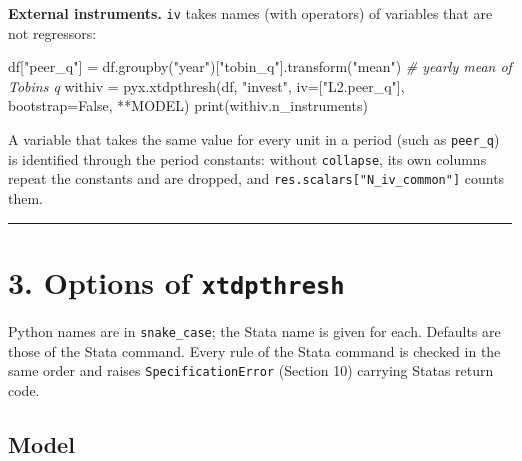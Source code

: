 \documentclass[
  10.5pt,
  a4paper,
]{article}
\newenvironment{Shaded}{}{}
\newcommand{\BuiltInTok}[1]{\textcolor[rgb]{0.00,0.50,0.00}{#1}}
\newcommand{\CommentTok}[1]{\textcolor[rgb]{0.38,0.63,0.69}{\textit{#1}}}
\newcommand{\NormalTok}[1]{#1}
\newcommand{\OperatorTok}[1]{\textcolor[rgb]{0.40,0.40,0.40}{#1}}
\newcommand{\StringTok}[1]{\textcolor[rgb]{0.25,0.44,0.63}{#1}}
\newcommand{\VariableTok}[1]{\textcolor[rgb]{0.10,0.09,0.49}{#1}}
\begin{document}
\textbf{External instruments.} \texttt{iv} takes names (with operators)
of variables that are not regressors:

\begin{Shaded}
\begin{Highlighting}[]
\NormalTok{df[}\StringTok{"peer\_q"}\NormalTok{] }\OperatorTok{=}\NormalTok{ df.groupby(}\StringTok{"year"}\NormalTok{)[}\StringTok{"tobin\_q"}\NormalTok{].transform(}\StringTok{"mean"}\NormalTok{)  }\CommentTok{\# yearly mean of Tobin\textquotesingle{}s q}
\NormalTok{withiv }\OperatorTok{=}\NormalTok{ pyx.xtdpthresh(df, }\StringTok{"invest"}\NormalTok{, iv}\OperatorTok{=}\NormalTok{[}\StringTok{"L2.peer\_q"}\NormalTok{], bootstrap}\OperatorTok{=}\VariableTok{False}\NormalTok{, }\OperatorTok{**}\NormalTok{MODEL)}
\BuiltInTok{print}\NormalTok{(withiv.n\_instruments)}
\end{Highlighting}
\end{Shaded}

A variable that takes the same value for every unit in a period (such as
\texttt{peer\_q}) is identified through the period constants: without
\texttt{collapse}, its own columns repeat the constants and are dropped,
and \texttt{res.scalars{[}"N\_iv\_common"{]}} counts them.

\begin{center}\rule{0.5\linewidth}{0.5pt}\end{center}

\section{\texorpdfstring{3. Options of
\texttt{xtdpthresh}}{3. Options of xtdpthresh}}\label{options-of-xtdpthresh}

Python names are in \texttt{snake\_case}; the Stata name is given for
each. Defaults are those of the Stata command. Every rule of the Stata
command is checked in the same order and raises
\texttt{SpecificationError} (Section 10) carrying
Stata\textquotesingle s return code.

\subsection{Model}\label{model}
\end{document}

